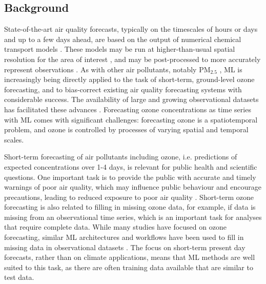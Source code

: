 \documentclass[gmd, manuscript]{copernicus}
\begin{document}
\subsection{Background}
State-of-the-art air quality forecasts, typically on the timescales of hours or days and up to a few days ahead, are based on the output of numerical chemical transport models \citep{Marecal2015}. These models may be run at higher-than-usual spatial resolution for the area of interest \citep{Savage2013}, and may be post-processed to more accurately represent observations \citep{Casciaro2022}. As with other air pollutants, notably PM$_{2.5}$ \citep{Feng2015}, ML is increasingly being directly applied to the task of short-term, ground-level ozone forecasting, and to bias-correct existing air quality forecasting systems with considerable success. The availability of large and growing observational datasets has facilitated these advances \citep{Schultz2017}. Forecasting ozone concentrations as time series with ML comes with significant challenges: forecasting ozone is a spatiotemporal problem, and ozone is controlled by processes of varying spatial and temporal scales.  

Short-term forecasting of air pollutants including ozone, i.e. predictions of expected concentrations over 1-4 days, is relevant for public health and scientific questions. One important task is to provide the public with accurate and timely warnings of poor air quality, which may influence public behaviour and encourage precautions, leading to reduced exposure to poor air quality \citep{Buonocore2021, Hahm2021,Alari2021, Saberian2017}. Short-term ozone forecasting is also related to filling in missing ozone data, for example, if data is missing from an observational time series, which is an important task for analyses that require complete data. While many studies have focused on ozone forecasting, similar ML architectures and workflows have been used to fill in missing data in observational datasets \citep{betancourt_global_2022, Wu2024}. The focus on short-term present day forecasts, rather than on climate applications, means that ML methods are well suited to this task, as there are often training data available that are similar to test data. 
\end{document}
